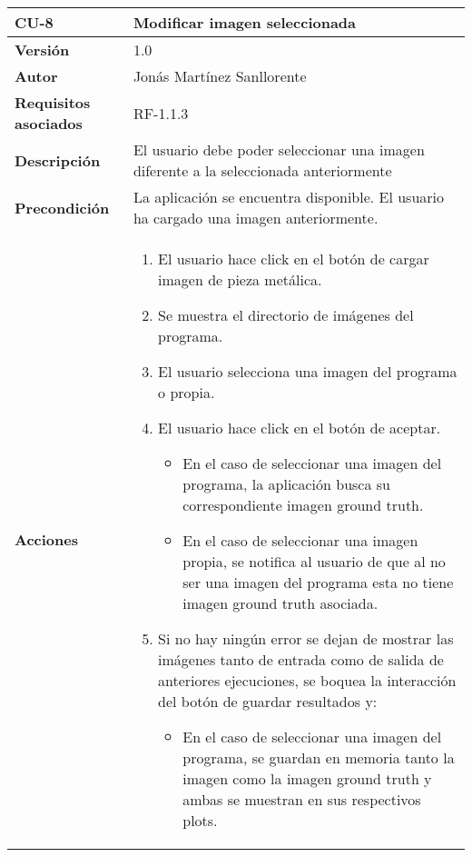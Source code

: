 \begin{table}[p]
	\centering
	\begin{tabularx}{\linewidth}{ p{} p{} }
		\toprule
		\textbf{CU-8}    & \textbf{Modificar imagen seleccionada}\\
		\toprule
		\textbf{Versión}              & 1.0    \\
		\textbf{Autor}                & Jonás Martínez Sanllorente \\
		\textbf{Requisitos asociados} & RF-1.1.3 \\
		\textbf{Descripción}          & El usuario debe poder seleccionar una imagen diferente a la seleccionada anteriormente \\
		\textbf{Precondición}         & La aplicación se encuentra disponible.\newline
                                        El usuario ha cargado una imagen anteriormente.\\
		\textbf{Acciones}             &
		\begin{enumerate}
			\def\labelenumi{\arabic{enumi}.}
			\tightlist
			\item El usuario hace click en el botón de cargar imagen de pieza metálica.
            \item Se muestra el directorio de imágenes del programa.
            \item El usuario selecciona una imagen del programa o propia.
            \item El usuario hace click en el botón de aceptar.
            \begin{itemize}
                \item En el caso de seleccionar una imagen del programa, la aplicación busca su correspondiente imagen ground truth.
                \item En el caso de seleccionar una imagen propia, se notifica al usuario de que al no ser una imagen del programa esta no tiene imagen ground truth asociada.
            \end{itemize}
            \item Si no hay ningún error se dejan de mostrar las imágenes tanto de entrada como de salida de anteriores ejecuciones, se boquea la interacción del botón de guardar resultados y: 
            \begin{itemize}
                \item En el caso de seleccionar una imagen del programa, se guardan en memoria tanto la imagen como la imagen ground truth y ambas se muestran en sus respectivos plots.

\end{itemize}
\end{enumerate}
\end{tabularx}
\end{table}
